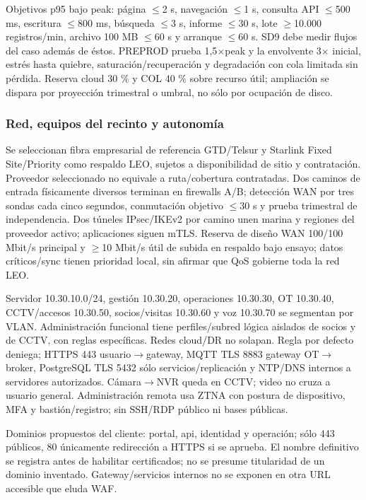 \documentclass[11pt,letterpaper]{report}
\begin{document}
Objetivos p95 bajo peak: página $\leq$2 s, navegación $\leq$1 s, consulta API $\leq$500 ms, escritura $\leq$800 ms, búsqueda $\leq$3 s, informe $\leq$30 s, lote $\geq$10.000 registros/min, archivo 100 MB $\leq$60 s y arranque $\leq$60 s. SD9 debe medir flujos del caso además de éstos. PREPROD prueba 1,5$\times$peak y la envolvente 3$\times$ inicial, estrés hasta quiebre, saturación/recuperación y degradación con cola limitada sin pérdida. Reserva cloud 30 \% y COL 40 \% sobre recurso útil; ampliación se dispara por proyección trimestral o umbral, no sólo por ocupación de disco.

\subsubsection*{Red, equipos del recinto y autonomía}
Se seleccionan fibra empresarial de referencia GTD/Telsur y Starlink Fixed Site/Priority como respaldo LEO, sujetos a disponibilidad de sitio y contratación. Proveedor seleccionado no equivale a ruta/cobertura contratadas. Dos caminos de entrada físicamente diversos terminan en firewalls A/B; detección WAN por tres sondas cada cinco segundos, conmutación objetivo $\leq$30 s y prueba trimestral de independencia. Dos túneles IPsec/IKEv2 por camino unen marina y regiones del proveedor activo; aplicaciones siguen mTLS. Reserva de diseño WAN 100/100 Mbit/s principal y $\geq$10 Mbit/s útil de subida en respaldo bajo ensayo; datos críticos/sync tienen prioridad local, sin afirmar que QoS gobierne toda la red LEO.

Servidor 10.30.10.0/24, gestión 10.30.20, operaciones 10.30.30, OT 10.30.40, CCTV/accesos 10.30.50, socios/visitas 10.30.60 y voz 10.30.70 se segmentan por VLAN. Administración funcional tiene perfiles/subred lógica aislados de socios y de CCTV, con reglas específicas. Redes cloud/DR no solapan. Regla por defecto deniega; HTTPS 443 usuario$\rightarrow$gateway, MQTT TLS 8883 gateway OT$\rightarrow$broker, PostgreSQL TLS 5432 sólo servicios/replicación y NTP/DNS internos a servidores autorizados. Cámara$\rightarrow$NVR queda en CCTV; video no cruza a usuario general. Administración remota usa ZTNA con postura de dispositivo, MFA y bastión/registro; sin SSH/RDP público ni bases públicas.

Dominios propuestos del cliente: portal, api, identidad y operación; sólo 443 públicos, 80 únicamente redirección a HTTPS si se aprueba. El nombre definitivo se registra antes de habilitar certificados; no se presume titularidad de un dominio inventado. Gateway/servicios internos no se exponen en otra URL accesible que eluda WAF.
\end{document}
